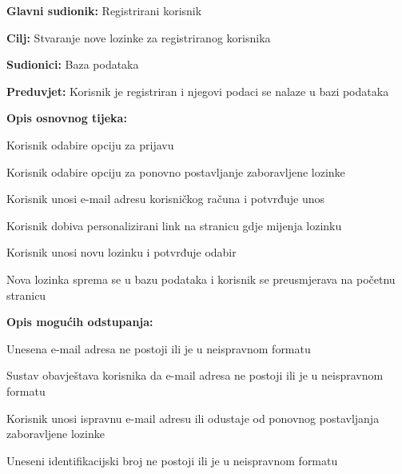 \noindent {}
\begin{packed_item}

	\item \textbf{Glavni sudionik: }Registrirani korisnik
	\item  \textbf{Cilj:} Stvaranje nove lozinke za registriranog korisnika
	\item  \textbf{Sudionici:} Baza podataka
	\item  \textbf{Preduvjet:} Korisnik je registriran i njegovi podaci se nalaze u bazi podataka
	\item  \textbf{Opis osnovnog tijeka:}

	\item[] \begin{packed_enum}

		\item Korisnik odabire opciju za prijavu
		\item Korisnik odabire opciju za ponovno postavljanje zaboravljene lozinke
		\item Korisnik unosi e-mail adresu korisničkog računa i potvrđuje unos
		\item Korisnik dobiva personalizirani link na stranicu gdje mijenja lozinku
		\item Korisnik unosi novu lozinku i potvrđuje odabir
		\item Nova lozinka sprema se u bazu podataka i korisnik se preusmjerava na početnu stranicu
	\end{packed_enum}

	\item  \textbf{Opis mogućih odstupanja:}

	\item[] \begin{packed_item}

		\item[3.a] Unesena e-mail adresa ne postoji ili je u neispravnom formatu
		\item[] \begin{packed_enum}

			\item Sustav obavještava korisnika da e-mail adresa ne postoji ili je u neispravnom formatu
			\item Korisnik unosi ispravnu e-mail adresu ili odustaje od ponovnog postavljanja zaboravljene lozinke

		\end{packed_enum}
		\item[4.a] Uneseni identifikacijski broj ne postoji ili je u neispravnom formatu
		\item[] \begin{packed_enum}


\end{packed_enum}
\end{packed_item}
\end{packed_item}

